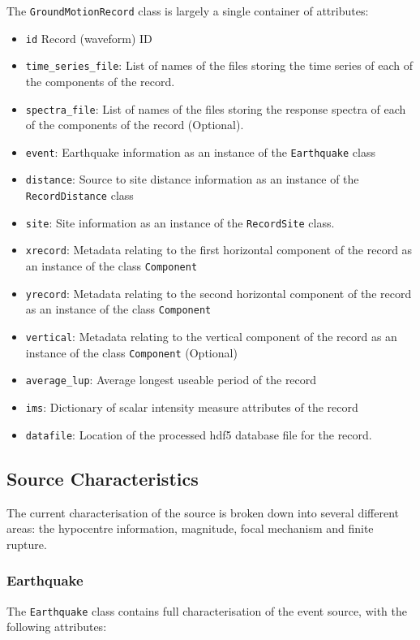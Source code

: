 The \verb=GroundMotionRecord= class is largely a single container of attributes:
\begin{itemize}
\item \verb=id= Record (waveform) ID
\item \verb=time_series_file=: List of names of the files storing the time series of each of the components of the record.
\item \verb=spectra_file=: List of names of the files storing the response spectra of each of the components of the record (Optional).
\item \verb=event=: Earthquake information as an instance of the \verb=Earthquake= class
\item \verb=distance=: Source to site distance information as an instance of the \verb=RecordDistance= class
\item \verb=site=: Site information as an instance of the \verb=RecordSite= class.
\item \verb=xrecord=: Metadata relating to the first horizontal component of the record as an instance of the class \verb=Component=
\item \verb=yrecord=: Metadata relating to the second horizontal component of the record as an instance of the class \verb=Component=
\item \verb=vertical=: Metadata relating to the vertical component of the record as an instance of the class \verb=Component= (Optional)
\item \verb=average_lup=: Average longest useable period of the record
\item \verb=ims=: Dictionary of scalar intensity measure attributes of the record
\item \verb=datafile=: Location of the processed hdf5 database file for the record.
\end{itemize}


\subsection{Source Characteristics}

The current characterisation of the source is broken down into several different areas: the hypocentre information, magnitude, focal mechanism and finite rupture.

\subsubsection{Earthquake}

The \verb=Earthquake= class contains full characterisation of the event source, with the following attributes:

